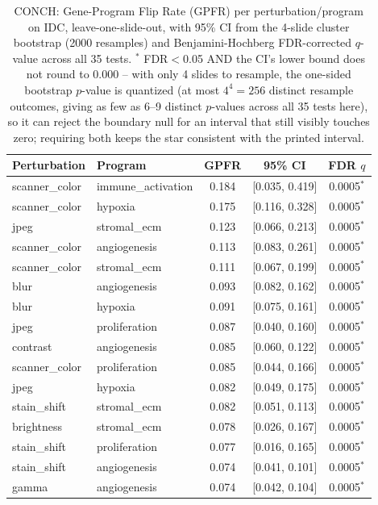 \begin{table}[t]
\centering
\caption{CONCH: Gene-Program Flip Rate (GPFR) per perturbation/program on IDC, leave-one-slide-out, with 95\% CI from the 4-slide cluster bootstrap (2000 resamples) and Benjamini-Hochberg FDR-corrected $q$-value across all 35 tests. $^{*}$ FDR$<$0.05 AND the CI's lower bound does not round to 0.000 -- with only 4 slides to resample, the one-sided bootstrap $p$-value is quantized (at most $4^4=256$ distinct resample outcomes, giving as few as 6--9 distinct $p$-values across all 35 tests here), so it can reject the boundary null for an interval that still visibly touches zero; requiring both keeps the star consistent with the printed interval.}
\label{tab:gpfr_loso_idc_conch}
\begin{tabular}{llccc}
\toprule
Perturbation & Program & GPFR & 95\% CI & FDR $q$ \\
\midrule
scanner\_color & immune\_activation & 0.184 & [0.035, 0.419] & 0.0005$^{*}$ \\
scanner\_color & hypoxia & 0.175 & [0.116, 0.328] & 0.0005$^{*}$ \\
jpeg & stromal\_ecm & 0.123 & [0.066, 0.213] & 0.0005$^{*}$ \\
scanner\_color & angiogenesis & 0.113 & [0.083, 0.261] & 0.0005$^{*}$ \\
scanner\_color & stromal\_ecm & 0.111 & [0.067, 0.199] & 0.0005$^{*}$ \\
blur & angiogenesis & 0.093 & [0.082, 0.162] & 0.0005$^{*}$ \\
blur & hypoxia & 0.091 & [0.075, 0.161] & 0.0005$^{*}$ \\
jpeg & proliferation & 0.087 & [0.040, 0.160] & 0.0005$^{*}$ \\
contrast & angiogenesis & 0.085 & [0.060, 0.122] & 0.0005$^{*}$ \\
scanner\_color & proliferation & 0.085 & [0.044, 0.166] & 0.0005$^{*}$ \\
jpeg & hypoxia & 0.082 & [0.049, 0.175] & 0.0005$^{*}$ \\
stain\_shift & stromal\_ecm & 0.082 & [0.051, 0.113] & 0.0005$^{*}$ \\
brightness & stromal\_ecm & 0.078 & [0.026, 0.167] & 0.0005$^{*}$ \\
stain\_shift & proliferation & 0.077 & [0.016, 0.165] & 0.0005$^{*}$ \\
stain\_shift & angiogenesis & 0.074 & [0.041, 0.101] & 0.0005$^{*}$ \\
gamma & angiogenesis & 0.074 & [0.042, 0.104] & 0.0005$^{*}$ \\

\end{tabular}
\end{table}
